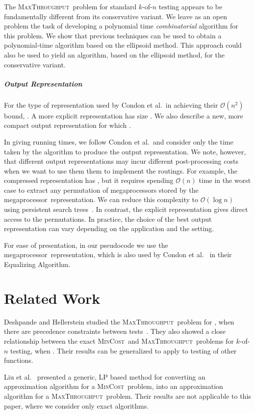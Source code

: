 \documentclass{article}
\newcommand{\ens}[1]{\ensuremath{#1}}					\newcommand{\card}[1]{\ens{|#1|}}							\newcommand{\dotlist}[2]{\ens{#1,\ldots,#2}}
\newcommand{\bigoh}[1]{\ens{\mathcal{O}(#1)}}				\newcommand{\bigom}[1]{\ens{\Omega(#1)}}
\newcommand{\valn}{\ens{n}}
\newcommand{\valk}{\ens{k}}
\newcommand{\maxthru}{\textsc{MaxThroughput}}
\newcommand{\mincost}{\textsc{MinCost}}
\newcommand{\kofn}{\valk-of-\valn}
\newcommand{\processor}{processor}
\newcommand{\megaprocessor}{mega\processor}
\begin{document}
The \maxthru\ problem for
standard \kofn{} testing appears to be fundamentally different
from its conservative variant.
We leave as an open problem the task of developing
a polynomial time {\em combinatorial} algorithm for this problem.
We show that previous techniques can
be used to obtain a polynomial-time
algorithm based on the ellipsoid method. This approach
could also be used to yield an algorithm, based on the
ellipsoid method, for the conservative variant.

\subparagraph{Output Representation}
For the type of representation used by Condon et al.~in achieving their
\bigoh{n^2} bound, .  A more explicit representation
has size .
We also describe a new, more compact output representation for which
. 

In giving running times, we follow Condon et al.~and 
consider only the time taken by the algorithm 
to produce the output representation.
We note, however, that different output representations may
incur different post-processing costs when we want to use them
them to implement the routings.
For example, the compressed representation has , 
but it requires spending \bigoh{n} time in the worst case 
to extract any permutation of \megaprocessor s stored by the 
\megaprocessor\ representation. We can reduce this complexity to 
\bigoh{\log n} using persistent 
search trees~\cite{DBLP:journals/cacm/SarnakT86}.  
In contrast, the explicit  representation gives direct access
to the permutations.
In practice, the choice of the best output representation can vary
depending on the application and the setting.

For ease of presentation, in our pseudocode we use the \megaprocessor\ representation, which is also used by Condon et al.~\cite{journals/talg/CondonDHW09} in their Equalizing Algorithm.

\section{Related Work}

Deshpande and Hellerstein studied the 
\maxthru\ problem for , when there are precedence constraints
between tests~\cite{DBLP:journals/talg/DeshpandeH12}.
They also showed a close relationship between
the exact \mincost\ and \maxthru\ problems for \kofn{} testing, when .
Their results can be generalized to apply to testing of other functions.

Liu et al.~\cite{conf/pods/LiuPRY08} presented a generic, 
LP based method for converting an 
approximation algorithm for a \mincost\ problem, into an approximation
algorithm for a \maxthru\ problem. Their results are not applicable to
this paper, where we consider only exact algorithms.
\end{document}
